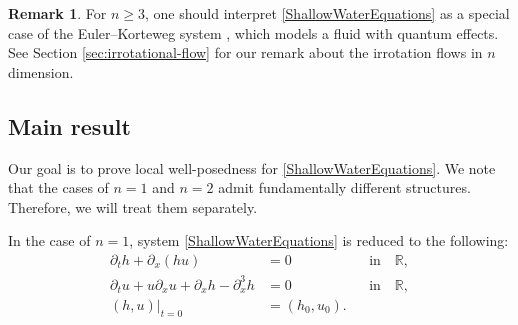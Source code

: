 \documentclass[reqno,11pt]{amsart}
\DeclareMathOperator{\Div}{div}
\theoremstyle{plain}
\theoremstyle{definition}
\newtheorem{remark}[theorem]{Remark}
\numberwithin{equation}{section}
\begin{document}
\smallskip
\begin{remark}
For $ n \geq 3 $, one should interpret \eqref{ShallowWaterEquations} as a special case of the Euler--Korteweg system \cite{BenzoniGavageDanchinDescombes3D, AntonelliMarcati1,BertiMasperoMurgante}, which models a fluid with quantum effects. See Section \ref{sec:irrotational-flow} for our remark about the irrotation flows in $ n $ dimension. 
\end{remark}

\subsection{Main result}
Our goal is to prove local well-posedness for \eqref{ShallowWaterEquations}. We note that the cases of $ n = 1 $ and $ n = 2 $ admit fundamentally different structures. Therefore, we will treat them separately.   %

In the case of $ n = 1 $, system \eqref{ShallowWaterEquations} is reduced to the following:
\begin{subequations}
    \label{sys:1-d_sw}
    \begin{align}
        \label{1-d-Mass}
        \partial_t h + \partial_x(hu) & = 0 \quad &&\text{in} \quad  \mathbb R, 
        \\
        \label{1-d-momentum}
        \partial_t u+ u \partial_x  u + \partial_x h - \partial_x^3 h & = 0 \quad && \text{in} \quad \mathbb R,\\
        \label{1-d-initial}
        (h,u)\vert_{t=0} & = (h_0,u_0). 
    \end{align}
\end{subequations}
\end{document}
